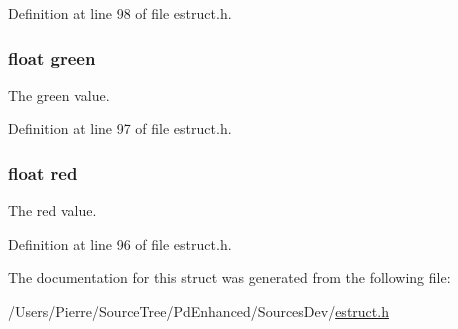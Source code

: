 Definition at line 98 of file estruct.\-h.

\hypertarget{struct__rgba_af8d69af46156237d69b44a880e4f486e}{
\subsubsection[{green}]{\setlength{\rightskip}{0pt plus 5cm}float green}}\label{struct__rgba_af8d69af46156237d69b44a880e4f486e}
The green value. 

Definition at line 97 of file estruct.\-h.

\hypertarget{struct__rgba_acddf4f34ba92c602d4205ba50e98d603}{
\subsubsection[{red}]{\setlength{\rightskip}{0pt plus 5cm}float red}}\label{struct__rgba_acddf4f34ba92c602d4205ba50e98d603}
The red value. 

Definition at line 96 of file estruct.\-h.



The documentation for this struct was generated from the following file\-:\begin{DoxyCompactItemize}
\item 
/\-Users/\-Pierre/\-Source\-Tree/\-Pd\-Enhanced/\-Sources\-Dev/\hyperlink{estruct_8h}{estruct.\-h}\end{DoxyCompactItemize}
